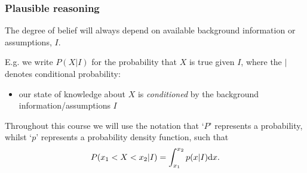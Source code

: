 \begin{frame}

\frametitle{Plausible reasoning}
\label{plausiblereasoning}

The degree of belief will always depend on available {\color{red} background information} or
assumptions, $I$.

E.g. we write $P(X|I)$ for the probability that $X$ is true given $I$, where the $|$ denotes
conditional probability:

\begin{itemize}
\item our state of knowledge about $X$ is \emph{conditioned} by the background information\slash assumptions $I$

\end{itemize}

Throughout this course we will use the notation that `$P$' represents a probability, whilst `$p$'
represents a probability density function, such that
\[
P(x_1<X<x_2|I) = \int_{x_1}^{x_2} p(x|I) {\rm d}x.
\]

\end{frame}

